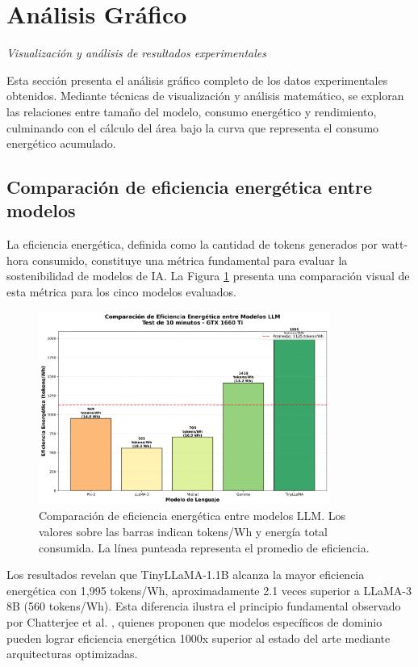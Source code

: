 \clearpage
\section{Análisis Gráfico}
\textit{Visualización y análisis de resultados experimentales}

Esta sección presenta el análisis gráfico completo de los datos experimentales obtenidos. Mediante técnicas de visualización y análisis matemático, se exploran las relaciones entre tamaño del modelo, consumo energético y rendimiento, culminando con el cálculo del área bajo la curva que representa el consumo energético acumulado.

\subsection{Comparación de eficiencia energética entre modelos}

La eficiencia energética, definida como la cantidad de tokens generados por watt-hora consumido, constituye una métrica fundamental para evaluar la sostenibilidad de modelos de IA. La Figura \ref{fig:eficiencia_barras} presenta una comparación visual de esta métrica para los cinco modelos evaluados.

\begin{figure}[H]
    \centering
    \includegraphics[width=0.85\textwidth]{figuras/png/grafico_1_eficiencia_barras.png}
    \caption{Comparación de eficiencia energética entre modelos LLM. Los valores sobre las barras indican tokens/Wh y energía total consumida. La línea punteada representa el promedio de eficiencia.}
    \label{fig:eficiencia_barras}
\end{figure}

Los resultados revelan que TinyLLaMA-1.1B alcanza la mayor eficiencia energética con 1,995 tokens/Wh, aproximadamente 2.1 veces superior a LLaMA-3 8B (560 tokens/Wh). Esta diferencia ilustra el principio fundamental observado por Chatterjee et al. \cite{chatterjee2025energy}, quienes proponen que modelos específicos de dominio pueden lograr eficiencia energética 1000x superior al estado del arte mediante arquitecturas optimizadas.

